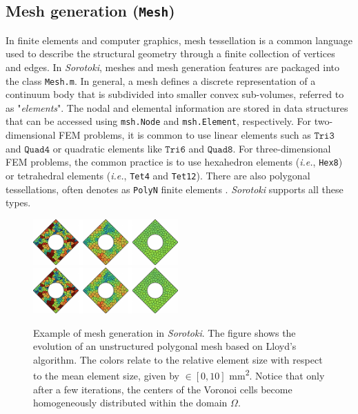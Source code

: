 \subsection{Mesh generation (\texttt{Mesh})}
\label{sec:C5:mesh}
In finite elements and computer graphics, mesh tessellation is a common language used to describe the structural geometry through a finite collection of vertices and edges. In \textit{Sorotoki}, meshes and mesh generation features are packaged into the class \texttt{Mesh.m}. In general, a mesh defines a discrete representation of a continuum body that is subdivided into smaller convex sub-volumes, referred to as "\textit{elements}". The nodal and elemental information are stored in data structures that can be accessed using \texttt{msh.Node} and \texttt{msh.Element}, respectively. For two-dimensional FEM problems, it is common to use linear elements such as $\texttt{Tri3}$ and $\texttt{Quad4}$ or quadratic elements like $\texttt{Tri6}$ and $\texttt{Quad8}$. For three-dimensional FEM problems, the common practice is to use hexahedron elements (\textit{i.e.}, \texttt{Hex8}) or tetrahedral elements (\textit{i.e.}, \texttt{Tet4} and \texttt{Tet12}). There are also polygonal tessellations, often denotes as \texttt{PolyN} finite elements \cite{Talischi2012Mar}. \textit{Sorotoki} supports all these types.
%
\begin{figure}[!t]
    \centering
    \includegraphics*[width=0.495\textwidth]{./pdf/thesis-figure-6-4.pdf}
    \includegraphics*[width=0.495\textwidth]{./pdf/thesis-figure-6-4.pdf}
    \caption{Example of mesh generation in \textit{Sorotoki}. The figure shows the evolution of an unstructured polygonal mesh based on Lloyd's algorithm. The colors relate to the relative element size with respect to the mean element size, given by \protect{}$\!\!\in [0,10]$ \si{\milli \meter \squared}. Notice that only after a few iterations, the centers of the Voronoi cells become homogeneously distributed within the domain $\Omega$.}
    \label{fig:sorotoki:meshexample}
    \vspace{-3mm}
\end{figure}

